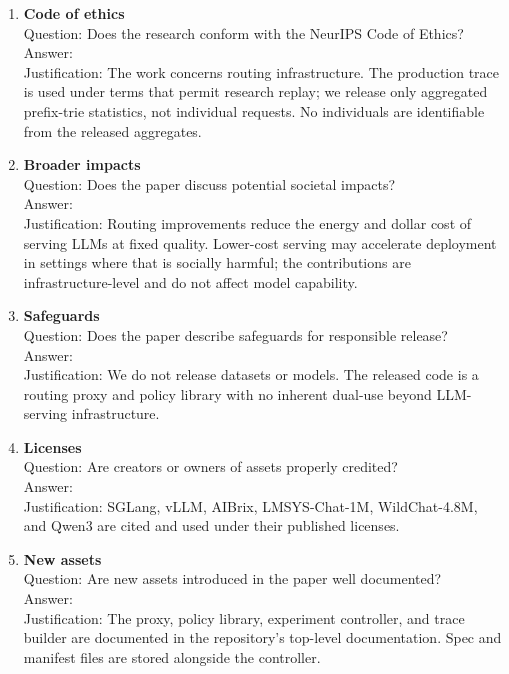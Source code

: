 \documentclass{article}
\begin{document}
\begin{enumerate}
\item {\bf Code of ethics}\\
Question: Does the research conform with the NeurIPS Code of Ethics?\\
Answer: \answerYes{}\\
Justification: The work concerns routing infrastructure. The production trace is used under terms that permit research replay; we release only aggregated prefix-trie statistics, not individual requests. No individuals are identifiable from the released aggregates.

\item {\bf Broader impacts}\\
Question: Does the paper discuss potential societal impacts?\\
Answer: \answerYes{}\\
Justification: Routing improvements reduce the energy and dollar cost of serving LLMs at fixed quality. Lower-cost serving may accelerate deployment in settings where that is socially harmful; the contributions are infrastructure-level and do not affect model capability.

\item {\bf Safeguards}\\
Question: Does the paper describe safeguards for responsible release?\\
Answer: \answerNA{}\\
Justification: We do not release datasets or models. The released code is a routing proxy and policy library with no inherent dual-use beyond LLM-serving infrastructure.

\item {\bf Licenses}\\
Question: Are creators or owners of assets properly credited?\\
Answer: \answerYes{}\\
Justification: SGLang, vLLM, AIBrix, LMSYS-Chat-1M, WildChat-4.8M, and Qwen3 are cited and used under their published licenses.

\item {\bf New assets}\\
Question: Are new assets introduced in the paper well documented?\\
Answer: \answerYes{}\\
Justification: The proxy, policy library, experiment controller, and trace builder are documented in the repository's top-level documentation. Spec and manifest files are stored alongside the controller.


\end{enumerate}
\end{document}
